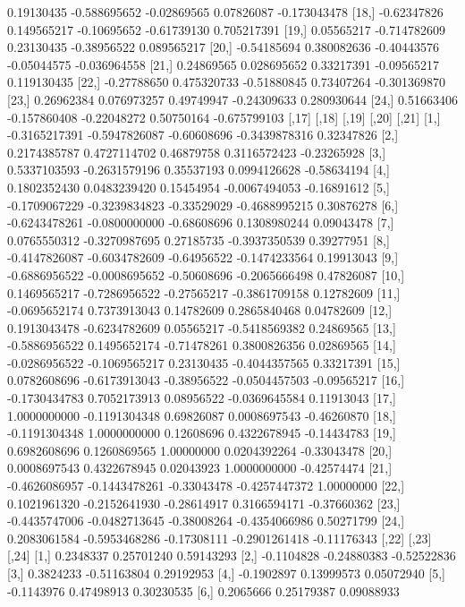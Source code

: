 \documentclass[a4paper, 12pt]{article}
\begin{document}
\begin{table}[H]
\begin{Schunk}
\begin{Soutput}
[17,]  0.19130435 -0.588695652 -0.02869565  0.07826087 -0.173043478
[18,] -0.62347826  0.149565217 -0.10695652 -0.61739130  0.705217391
[19,]  0.05565217 -0.714782609  0.23130435 -0.38956522  0.089565217
[20,] -0.54185694  0.380082636 -0.40443576 -0.05044575 -0.036964558
[21,]  0.24869565  0.028695652  0.33217391 -0.09565217  0.119130435
[22,] -0.27788650  0.475320733 -0.51880845  0.73407264 -0.301369870
[23,]  0.26962384  0.076973257  0.49749947 -0.24309633  0.280930644
[24,]  0.51663406 -0.157860408 -0.22048272  0.50750164 -0.675799103
              [,17]         [,18]       [,19]         [,20]       [,21]
 [1,] -0.3165217391 -0.5947826087 -0.60608696 -0.3439878316  0.32347826
 [2,]  0.2174385787  0.4727114702  0.46879758  0.3116572423 -0.23265928
 [3,]  0.5337103593 -0.2631579196  0.35537193  0.0994126628 -0.58634194
 [4,]  0.1802352430  0.0483239420  0.15454954 -0.0067494053 -0.16891612
 [5,] -0.1709067229 -0.3239834823 -0.33529029 -0.4688995215  0.30876278
 [6,] -0.6243478261 -0.0800000000 -0.68608696  0.1308980244  0.09043478
 [7,]  0.0765550312 -0.3270987695  0.27185735 -0.3937350539  0.39277951
 [8,] -0.4147826087 -0.6034782609 -0.64956522 -0.1474233564  0.19913043
 [9,] -0.6886956522 -0.0008695652 -0.50608696 -0.2065666498  0.47826087
[10,]  0.1469565217 -0.7286956522 -0.27565217 -0.3861709158  0.12782609
[11,] -0.0695652174  0.7373913043  0.14782609  0.2865840468  0.04782609
[12,]  0.1913043478 -0.6234782609  0.05565217 -0.5418569382  0.24869565
[13,] -0.5886956522  0.1495652174 -0.71478261  0.3800826356  0.02869565
[14,] -0.0286956522 -0.1069565217  0.23130435 -0.4044357565  0.33217391
[15,]  0.0782608696 -0.6173913043 -0.38956522 -0.0504457503 -0.09565217
[16,] -0.1730434783  0.7052173913  0.08956522 -0.0369645584  0.11913043
[17,]  1.0000000000 -0.1191304348  0.69826087  0.0008697543 -0.46260870
[18,] -0.1191304348  1.0000000000  0.12608696  0.4322678945 -0.14434783
[19,]  0.6982608696  0.1260869565  1.00000000  0.0204392264 -0.33043478
[20,]  0.0008697543  0.4322678945  0.02043923  1.0000000000 -0.42574474
[21,] -0.4626086957 -0.1443478261 -0.33043478 -0.4257447372  1.00000000
[22,]  0.1021961320 -0.2152641930 -0.28614917  0.3166594171 -0.37660362
[23,] -0.4435747006 -0.0482713645 -0.38008264 -0.4354066986  0.50271799
[24,]  0.2083061584 -0.5953468286 -0.17308111 -0.2901261418 -0.11176343
           [,22]       [,23]       [,24]
 [1,]  0.2348337  0.25701240  0.59143293
 [2,] -0.1104828 -0.24880383 -0.52522836
 [3,]  0.3824233 -0.51163804  0.29192953
 [4,] -0.1902897  0.13999573  0.05072940
 [5,] -0.1143976  0.47498913  0.30230535
 [6,]  0.2065666  0.25179387  0.09088933

\end{Soutput}
\end{Schunk}
\end{table}
\end{document}
